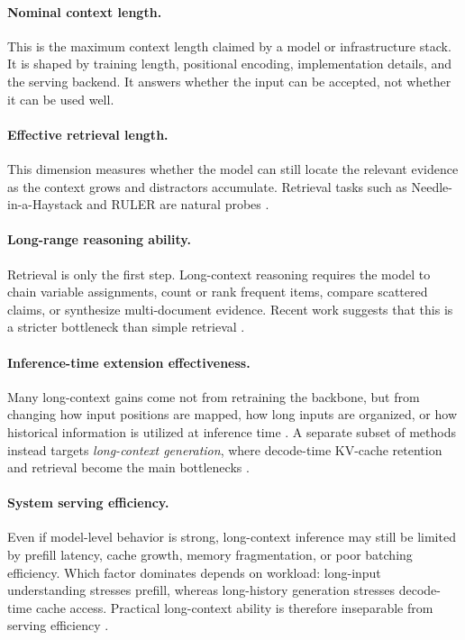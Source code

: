 \documentclass{article}
\begin{document}
\paragraph{Nominal context length.}
This is the maximum context length claimed by a model or infrastructure stack. It is shaped by training length, positional encoding, implementation details, and the serving backend. It answers whether the input can be accepted, not whether it can be used well.

\paragraph{Effective retrieval length.}
This dimension measures whether the model can still locate the relevant evidence as the context grows and distractors accumulate. Retrieval tasks such as Needle-in-a-Haystack and RULER are natural probes \citep{liu2024lost, hsieh2024ruler}.

\paragraph{Long-range reasoning ability.}
Retrieval is only the first step. Long-context reasoning requires the model to chain variable assignments, count or rank frequent items, compare scattered claims, or synthesize multi-document evidence. Recent work suggests that this is a stricter bottleneck than simple retrieval \citep{hsieh2024ruler, kuratov2024babilong, bai2025longbenchv2}.

\paragraph{Inference-time extension effectiveness.}
Many long-context gains come not from retraining the backbone, but from changing how input positions are mapped, how long inputs are organized, or how historical information is utilized at inference time \citep{chen2023pi, peng2023yarn, ding2024longrope, jin2024selfextend, xiao2024infllm}. A separate subset of methods instead targets \emph{long-context generation}, where decode-time KV-cache retention and retrieval become the main bottlenecks \citep{xiao2023streamingllm, zhang2023h2o, li2024snapkv, liu2024kivi, wang2025fier}.

\paragraph{System serving efficiency.}
Even if model-level behavior is strong, long-context inference may still be limited by prefill latency, cache growth, memory fragmentation, or poor batching efficiency. Which factor dominates depends on workload: long-input understanding stresses prefill, whereas long-history generation stresses decode-time cache access. Practical long-context ability is therefore inseparable from serving efficiency \citep{dao2022flashattention, dao2023flashattention2, kwon2023pagedattention, zheng2024sglang}.
\end{document}
